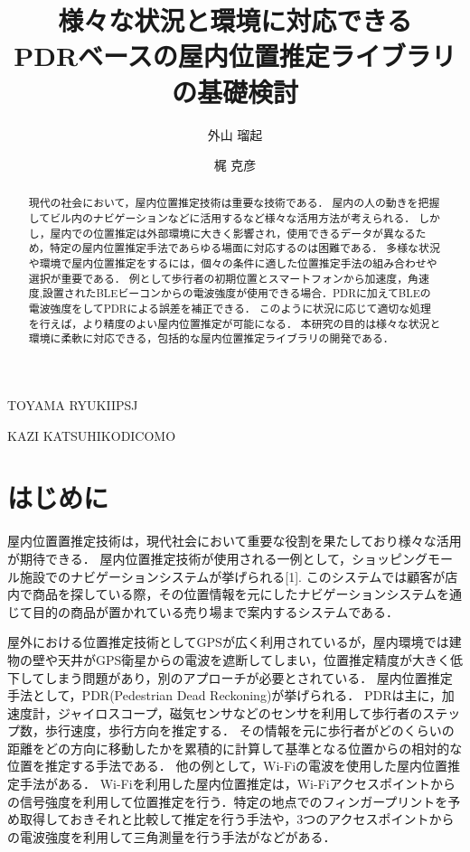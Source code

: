 \documentclass[Japanese]{dicomopapers}
\begin{document}
\title{様々な状況と環境に対応できる\\PDRベースの屋内位置推定ライブラリの基礎検討}


\author{外山 瑠起}{TOYAMA RYUKI}{IPSJ}
\author{梶 克彦}{KAZI KATSUHIKO}{DICOMO}

\begin{abstract}
	現代の社会において，屋内位置推定技術は重要な技術である．
	屋内の人の動きを把握してビル内のナビゲーションなどに活用するなど様々な活用方法が考えられる．
	しかし，屋内での位置推定は外部環境に大きく影響され，使用できるデータが異なるため，特定の屋内位置推定手法であらゆる場面に対応するのは困難である．
	多様な状況や環境で屋内位置推定をするには，個々の条件に適した位置推定手法の組み合わせや選択が重要である．
	例として歩行者の初期位置とスマートフォンから加速度，角速度,設置されたBLEビーコンからの電波強度が使用できる場合．PDRに加えてBLEの電波強度をしてPDRによる誤差を補正できる．
	このように状況に応じて適切な処理を行えば，より精度のよい屋内位置推定が可能になる．
	本研究の目的は様々な状況と環境に柔軟に対応できる，包括的な屋内位置推定ライブラリの開発である．
\end{abstract}

\maketitle

\section{はじめに}
屋内位置置推定技術は，現代社会において重要な役割を果たしており様々な活用が期待できる．
屋内位置推定技術が使用される一例として，ショッピングモール施設でのナビゲーションシステムが挙げられる[1].
このシステムでは顧客が店内で商品を探している際，その位置情報を元にしたナビゲーションシステムを通じて目的の商品が置かれている売り場まで案内するシステムである．

屋外における位置推定技術としてGPSが広く利用されているが，屋内環境では建物の壁や天井がGPS衛星からの電波を遮断してしまい，位置推定精度が大きく低下してしまう問題があり，別のアプローチが必要とされている．
屋内位置推定手法として，PDR(Pedestrian Dead Reckoning)が挙げられる．
PDRは主に，加速度計，ジャイロスコープ，磁気センサなどのセンサを利用して歩行者のステップ数，歩行速度，歩行方向を推定する．
その情報を元に歩行者がどのくらいの距離をどの方向に移動したかを累積的に計算して基準となる位置からの相対的な位置を推定する手法である．
他の例として，Wi-Fiの電波を使用した屋内位置推定手法がある．
Wi-Fiを利用した屋内位置推定は，Wi-Fiアクセスポイントからの信号強度を利用して位置推定を行う．特定の地点でのフィンガープリントを予め取得しておきそれと比較して推定を行う手法や，3つのアクセスポイントからの電波強度を利用して三角測量を行う手法がなどがある．
\end{document}
